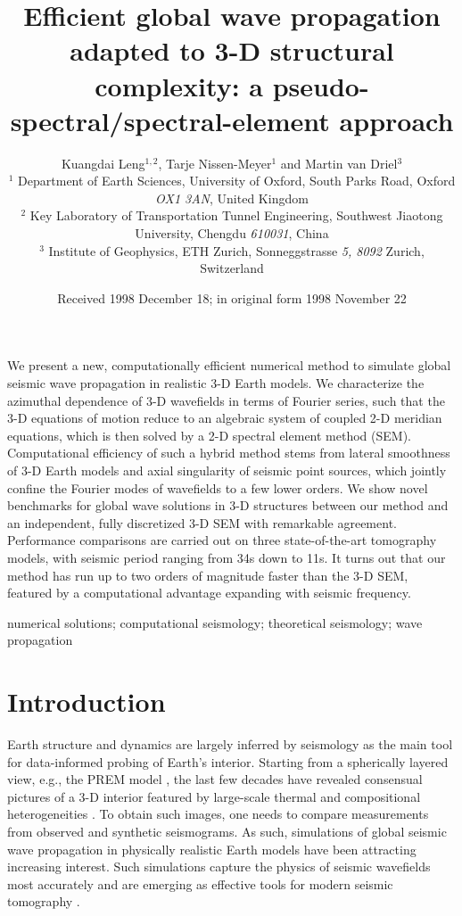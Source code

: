 \documentclass[extra,referee]{gji}
\title[Waves in 3-D Earth]
  {Efficient global wave propagation adapted to 3-D structural complexity: 
  a pseudo-spectral/spectral-element approach}
\author[K Leng et al.]
  {Kuangdai Leng$^{1, 2}$, Tarje Nissen-Meyer$^1$ and Martin van Driel$^3$\\
  $^1$ Department of Earth Sciences, University of Oxford, South Parks Road,
  Oxford \emph{OX1 3AN}, United Kingdom\\
  $^2$ Key Laboratory of Transportation Tunnel Engineering, Southwest Jiaotong University, 
  Chengdu \emph{610031}, China\\
  $^3$ Institute of Geophysics, ETH Zurich, 
  Sonneggstrasse \emph{5, 8092} Zurich, Switzerland}
\date{Received 1998 December 18; in original form 1998 November 22}
\begin{document}
\label{firstpage}
\maketitle


\begin{summary}
  We present a new, computationally efficient numerical method to
  simulate global seismic wave propagation in realistic 3-D Earth models.
%   
  We characterize the azimuthal dependence of 3-D wavefields in 
  terms of Fourier series, such that the 3-D equations of motion reduce to 
  an algebraic system of coupled 2-D meridian equations, 
  which is then solved by a 2-D spectral element method (SEM).
%   
  Computational efficiency of such a hybrid method stems from 
  lateral smoothness of 3-D Earth models and axial singularity of seismic point sources, 
  which jointly confine the Fourier modes of wavefields to a few lower orders. 
%  
  We show novel benchmarks for global wave solutions in 3-D structures 
  between our method and an independent, fully discretized 3-D SEM
  with remarkable agreement.
%  
  Performance comparisons are carried out on three state-of-the-art tomography 
  models, with seismic period ranging from 34s down to 11s.
%   
  It turns out that our method has run up to two orders of magnitude faster than the 
  3-D SEM, featured by a computational advantage expanding with seismic frequency. 
\end{summary}

\begin{keywords}
  numerical solutions; computational seismology; theoretical seismology; 
  wave propagation
\end{keywords}

\section{Introduction}
Earth structure and dynamics are largely inferred by seismology 
as the main tool for data-informed probing of Earth's interior. 
Starting from a spherically layered view, e.g., 
the PREM model \cite[]{dziewonski1981prem}, 
the last few decades have revealed consensual pictures of a 3-D
interior featured by large-scale thermal and compositional heterogeneities 
\cite[]{becker2002comparison}.
To obtain such images, one needs to compare measurements from observed and synthetic seismograms. 
As such, simulations of global seismic wave propagation in physically realistic 
Earth models have been attracting increasing interest. 
Such simulations capture the physics of seismic wavefields  
most accurately and are emerging as effective tools for 
modern seismic tomography \cite[]{tromp2005seismic, 
nolet2008breviary, rawlinson2010seismic}.
\end{document}
